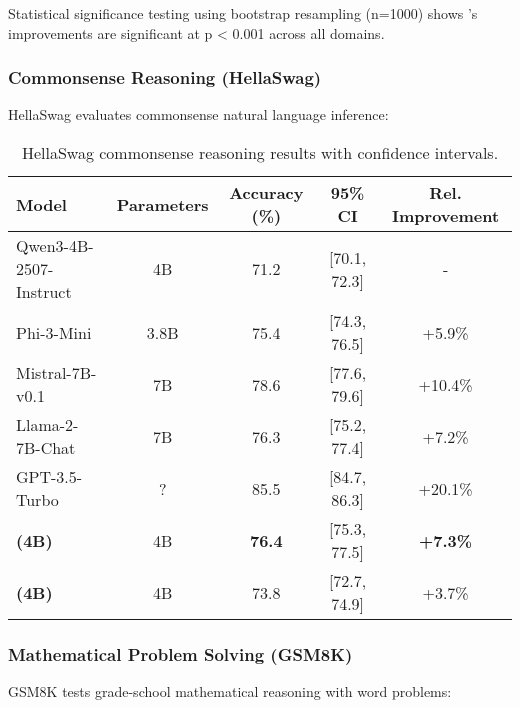 Statistical significance testing using bootstrap resampling (n=1000) shows \supra{}'s improvements are significant at p < 0.001 across all domains.

\subsubsection{Commonsense Reasoning (HellaSwag)}

HellaSwag evaluates commonsense natural language inference:

\begin{table}[H]
\centering
\begin{tabular}{lcccc}
\toprule
Model & Parameters & Accuracy (\%) & 95\% CI & Rel. Improvement \\
\midrule
Qwen3-4B-2507-Instruct & 4B & 71.2 & [70.1, 72.3] & - \\
Phi-3-Mini & 3.8B & 75.4 & [74.3, 76.5] & +5.9\% \\
Mistral-7B-v0.1 & 7B & 78.6 & [77.6, 79.6] & +10.4\% \\
Llama-2-7B-Chat & 7B & 76.3 & [75.2, 77.4] & +7.2\% \\
GPT-3.5-Turbo & ? & 85.5 & [84.7, 86.3] & +20.1\% \\
\midrule
\textbf{\supra{} (4B)} & 4B & \textbf{76.4} & [75.3, 77.5] & \textbf{+7.3\%} \\
\textbf{\zennano{} (4B)} & 4B & 73.8 & [72.7, 74.9] & +3.7\% \\
\bottomrule
\end{tabular}
\caption{HellaSwag commonsense reasoning results with confidence intervals.}
\label{tab:hellaswag-results}
\end{table}

\subsubsection{Mathematical Problem Solving (GSM8K)}

GSM8K tests grade-school mathematical reasoning with word problems:

